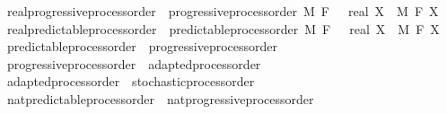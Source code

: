 \begin{isabellebody}
\isamarkupfalse%
\ real{\isacharunderscore}{\kern0pt}progressive{\isacharunderscore}{\kern0pt}process{\isacharunderscore}{\kern0pt}order\ {\isacharequal}{\kern0pt}\ progressive{\isacharunderscore}{\kern0pt}process{\isacharunderscore}{\kern0pt}order\ M\ F\ {\isachardoublequoteopen}{}\ {\isacharcolon}{\kern0pt}{\isacharcolon}{\kern0pt}\ real{\isachardoublequoteclose}\ X\ \ M\ F\ X\isanewline
{}\isamarkupfalse%
\ real{\isacharunderscore}{\kern0pt}predictable{\isacharunderscore}{\kern0pt}process{\isacharunderscore}{\kern0pt}order\ {\isacharequal}{\kern0pt}\ predictable{\isacharunderscore}{\kern0pt}process{\isacharunderscore}{\kern0pt}order\ M\ F\ {\isachardoublequoteopen}{}\ {\isacharcolon}{\kern0pt}{\isacharcolon}{\kern0pt}\ real{\isachardoublequoteclose}\ X\ \ M\ F\ X\isanewline
\isanewline
\isanewline
\isanewline
{}\isamarkupfalse%
\ predictable{\isacharunderscore}{\kern0pt}process{\isacharunderscore}{\kern0pt}order\ {\isasymsubseteq}\ progressive{\isacharunderscore}{\kern0pt}process{\isacharunderscore}{\kern0pt}order%
\isadelimproof
\ %
\endisadelimproof
%
\isatagproof
\isacommand{{\isachardot}{\kern0pt}{\isachardot}{\kern0pt}}\isamarkupfalse%
%
\endisatagproof
{\isafoldproof}%
%
\isadelimproof
%
\endisadelimproof
\isanewline
{}\isamarkupfalse%
\ progressive{\isacharunderscore}{\kern0pt}process{\isacharunderscore}{\kern0pt}order\ {\isasymsubseteq}\ adapted{\isacharunderscore}{\kern0pt}process{\isacharunderscore}{\kern0pt}order%
\isadelimproof
\ %
\endisadelimproof
%
\isatagproof
\isacommand{{\isachardot}{\kern0pt}{\isachardot}{\kern0pt}}\isamarkupfalse%
%
\endisatagproof
{\isafoldproof}%
%
\isadelimproof
%
\endisadelimproof
\isanewline
{}\isamarkupfalse%
\ adapted{\isacharunderscore}{\kern0pt}process{\isacharunderscore}{\kern0pt}order\ {\isasymsubseteq}\ stochastic{\isacharunderscore}{\kern0pt}process{\isacharunderscore}{\kern0pt}order%
\isadelimproof
\ %
\endisadelimproof
%
\isatagproof
\isacommand{{\isachardot}{\kern0pt}{\isachardot}{\kern0pt}}\isamarkupfalse%
%
\endisatagproof
{\isafoldproof}%
%
\isadelimproof
%
\endisadelimproof
\isanewline
\isanewline
{}\isamarkupfalse%
\ nat{\isacharunderscore}{\kern0pt}predictable{\isacharunderscore}{\kern0pt}process{\isacharunderscore}{\kern0pt}order\ {\isasymsubseteq}\ nat{\isacharunderscore}{\kern0pt}progressive{\isacharunderscore}{\kern0pt}process{\isacharunderscore}{\kern0pt}order%
\isadelimproof
\ %
\endisadelimproof
%
\isatagproof
\isacommand{{\isachardot}{\kern0pt}{\isachardot}{\kern0pt}}\isamarkupfalse%

\end{isabellebody}
